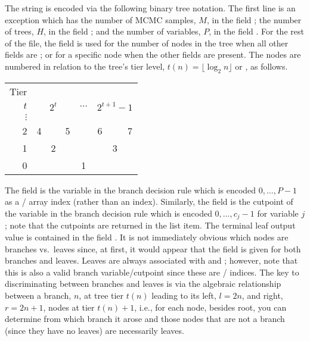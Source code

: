 \documentclass[article]{jss}
\begin{document}
The string is encoded via the following binary tree notation.  The
first line is an exception which has the number of MCMC samples, $M$,
in the field ; the number of trees, $H$, in the field
; and the number of variables, $P$, in the field .
For the rest of the file, the field  is used for the number
of nodes in the tree when all other fields are ; or for a
specific node when the other fields are present.  The nodes are
numbered in relation to the tree's tier level, 
$t(n)=\lfloor \log_2 n \rfloor$ or
, as follows.
\begin{table}[!h]\label{tree-schematic}
\begin{center}
\begin{tabular}{r|ccccccc} \hline
Tier & \\ %
$t$ & \multicolumn{3}{c}{$2^t$} & $\dots$ &
\multicolumn{3}{c}{$2^{t+1}\!-\!1$} \\ 
$\vdots$ & \\
2 & 4 &   & 5 &   & 6 &   & 7 \\
1 &   & 2 &   &   &   & 3 &   \\
0 &   &   &   & 1 &   &   &   \\ \hline
\end{tabular}
\end{center}
\end{table}

The  field is the variable in the branch decision rule which
is encoded $0, \dots, P-1$ as a / array
index (rather than an  index).  Similarly, the 
field is the cutpoint of the variable in the branch decision rule
which is encoded $0, \dots, c_j-1$ for variable $j$; note that the
cutpoints are returned in the  list item.
The terminal leaf output value is contained in the field .
It is not immediately obvious which nodes are branches vs.\ leaves
since, at first, it would appear that the  field is given
for both branches and leaves.  Leaves are always associated with
 and ; however, note that this is also a valid
branch variable/cutpoint since these are /
indices.
The key to discriminating between branches and leaves is via the
algebraic relationship between a branch, $n$, at tree tier $t(n)$
leading to its left, $l=2n$, and right, $r=2n+1$, nodes at tier
$t(n)+1$, i.e., for each node, besides root,
you can determine from which branch it arose and those nodes that are
not a branch (since they have no leaves) are necessarily leaves.
\end{document}
